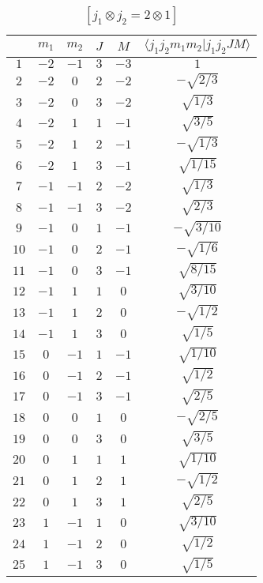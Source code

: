 \begin{table}
\tiny
\caption{$[j_1 \otimes j_2 = 2 \otimes 1]$}
\begin{center}
\begin{tabular}{|c|c|c|c|c|c|}
\hline 
   & $m_1$ & $m_2$ & $J$ & $M$ & $\langle j_1 j_2 m_1 m_2 | j_1 j_2 J M \rangle$ \\ 
\hline 
$1$ & $-2$ & $-1$ & $3$ & $-3$ & $1$ \\ 
$2$ & $-2$ & $0$ & $2$ & $-2$ & $-\sqrt{2/3}$ \\ 
$3$ & $-2$ & $0$ & $3$ & $-2$ & $\sqrt{1/3}$ \\ 
$4$ & $-2$ & $1$ & $1$ & $-1$ & $\sqrt{3/5}$ \\ 
$5$ & $-2$ & $1$ & $2$ & $-1$ & $-\sqrt{1/3}$ \\ 
$6$ & $-2$ & $1$ & $3$ & $-1$ & $\sqrt{1/15}$ \\ 
$7$ & $-1$ & $-1$ & $2$ & $-2$ & $\sqrt{1/3}$ \\ 
$8$ & $-1$ & $-1$ & $3$ & $-2$ & $\sqrt{2/3}$ \\ 
$9$ & $-1$ & $0$ & $1$ & $-1$ & $-\sqrt{3/10}$ \\ 
$10$ & $-1$ & $0$ & $2$ & $-1$ & $-\sqrt{1/6}$ \\ 
$11$ & $-1$ & $0$ & $3$ & $-1$ & $\sqrt{8/15}$ \\ 
$12$ & $-1$ & $1$ & $1$ & $0$ & $\sqrt{3/10}$ \\ 
$13$ & $-1$ & $1$ & $2$ & $0$ & $-\sqrt{1/2}$ \\ 
$14$ & $-1$ & $1$ & $3$ & $0$ & $\sqrt{1/5}$ \\ 
$15$ & $0$ & $-1$ & $1$ & $-1$ & $\sqrt{1/10}$ \\ 
$16$ & $0$ & $-1$ & $2$ & $-1$ & $\sqrt{1/2}$ \\ 
$17$ & $0$ & $-1$ & $3$ & $-1$ & $\sqrt{2/5}$ \\ 
$18$ & $0$ & $0$ & $1$ & $0$ & $-\sqrt{2/5}$ \\ 
$19$ & $0$ & $0$ & $3$ & $0$ & $\sqrt{3/5}$ \\ 
$20$ & $0$ & $1$ & $1$ & $1$ & $\sqrt{1/10}$ \\ 
$21$ & $0$ & $1$ & $2$ & $1$ & $-\sqrt{1/2}$ \\ 
$22$ & $0$ & $1$ & $3$ & $1$ & $\sqrt{2/5}$ \\ 
$23$ & $1$ & $-1$ & $1$ & $0$ & $\sqrt{3/10}$ \\ 
$24$ & $1$ & $-1$ & $2$ & $0$ & $\sqrt{1/2}$ \\ 
$25$ & $1$ & $-1$ & $3$ & $0$ & $\sqrt{1/5}$ \\ 

\end{tabular}
\end{center}
\end{table}
